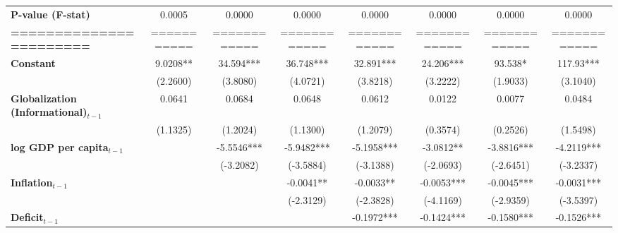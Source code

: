 \begin{center}
\begin{tabular}{lccccccc}
\textbf{P-value (F-stat)}          &       0.0005      &        0.0000        &           0.0000          &       0.0000       &      0.0000     &           0.0000          &            0.0000             \\
\textbf{=======================}   &    ===========    &     ============     &        ============       &    ============    &   ============  &        ============       &         ============          \\
\textbf{Constant}                     &      9.0208**     &      34.594***       &         36.748***         &     32.891***      &    24.206***    &          93.538*          &          117.93***            \\
\textbf{ }                         &      (2.2600)     &       (3.8080)       &          (4.0721)         &      (3.8218)      &     (3.2222)    &          (1.9033)         &           (3.1040)            \\
\textbf{Globalization (Informational)$_{t-1}$}             &       0.0641      &        0.0684        &           0.0648          &       0.0612       &      0.0122     &           0.0077          &            0.0484             \\
\textbf{ }                         &      (1.1325)     &       (1.2024)       &          (1.1300)         &      (1.2079)      &     (0.3574)    &          (0.2526)         &           (1.5498)            \\
\textbf{log GDP per capita$_{t-1}$}           &                   &      -5.5546***      &         -5.9482***        &     -5.1958***     &    -3.0812**    &         -3.8816***        &          -4.2119***           \\
\textbf{ }                         &                   &      (-3.2082)       &         (-3.5884)         &     (-3.1388)      &    (-2.0693)    &         (-2.6451)         &          (-3.2337)            \\
\textbf{Inflation$_{t-1}$}      &                   &                      &         -0.0041**         &     -0.0033**      &    -0.0053***   &         -0.0045***        &          -0.0031***           \\
\textbf{ }                         &                   &                      &         (-2.3129)         &     (-2.3828)      &    (-4.1169)    &         (-2.9359)         &          (-3.5397)            \\
\textbf{Deficit$_{t-1}$}             &                   &                      &                           &     -0.1972***     &    -0.1424***   &         -0.1580***        &          -0.1526***           \\

\end{tabular}
\end{center}
